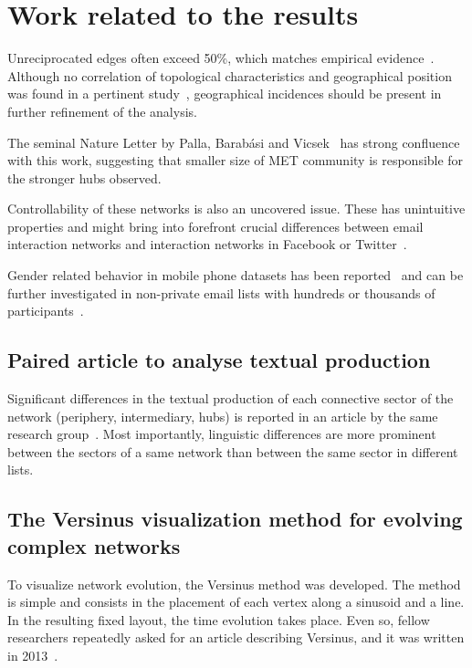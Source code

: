 \documentclass[%
 aip,
 jmp,%
 amsmath,amssymb,
 reprint,%
]{revtex4-1}
\begin{document}
\section{Work related to the results}\label{sec:fure}
Unreciprocated edges often exceed 50\%, which matches empirical evidence~\cite{newmanEvolving}. Although no correlation of topological characteristics and geographical position was found in a pertinent study~\cite{barabasiGeo}, geographical incidences should be present in further refinement of the analysis.

The seminal Nature Letter by Palla, Barab{\'a}si and Vicsek~\cite{barabasiEvo} has strong confluence with this work, suggesting that smaller size of MET community is responsible for the stronger hubs observed.

Controllability of these networks is also an uncovered issue. These has unintuitive properties and might bring into forefront crucial differences between email interaction networks and interaction networks in Facebook or Twitter~\cite{barabasiControlCapacity,barabasiControlCentrality,barabasiControllability}.

Gender related behavior in mobile phone datasets has been reported~\cite{barabasiSex} and can be further investigated in non-private email lists with hundreds or thousands of participants~\cite{GMANE}.

\subsection{Paired article to analyse textual production}
Significant differences in the textual production of each connective sector of the network (periphery, intermediary, hubs) is reported in an article by the same research group~\cite{rcText}. Most importantly, linguistic differences are more prominent between the sectors of a same network than between the same sector in different lists. 

\subsection{The Versinus visualization method for evolving complex networks}
To visualize network evolution, the Versinus method was developed. The method is simple and consists in the placement of each vertex along a sinusoid and a line. In the resulting fixed layout, the time evolution takes place.  Even so, fellow researchers repeatedly asked for an article describing Versinus, and it was written in 2013~\cite{versinus}.
\end{document}
